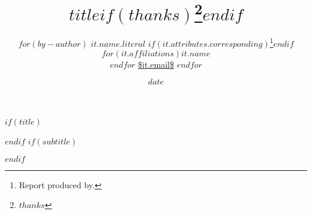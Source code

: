 $if(title)$
\title{\vspace{40mm}\huge\textbf{\textcolor{abcdsnavy}{$title$}$if(thanks)$\thanks{$thanks$}$endif$}}
$endif$
$if(subtitle)$
\usepackage{etoolbox}
\makeatletter
\providecommand{\subtitle}[1]{ %
  \apptocmd{\@title}{\par {\Large\textit{\textcolor{abcdsnavy}{#1}} \par}}{}{}
}
\subtitle{$subtitle$}
$endif$

\author{
  $for(by-author)$
  {\large $it.name.literal$}%
  $if(it.attributes.corresponding)$\thanks{Report produced by.}$endif$ \\%
  $for(it.affiliations)$$it.name$ \\$endfor$%
    {\url{$it.email$}}
  $endfor$
}

\date{$date$}